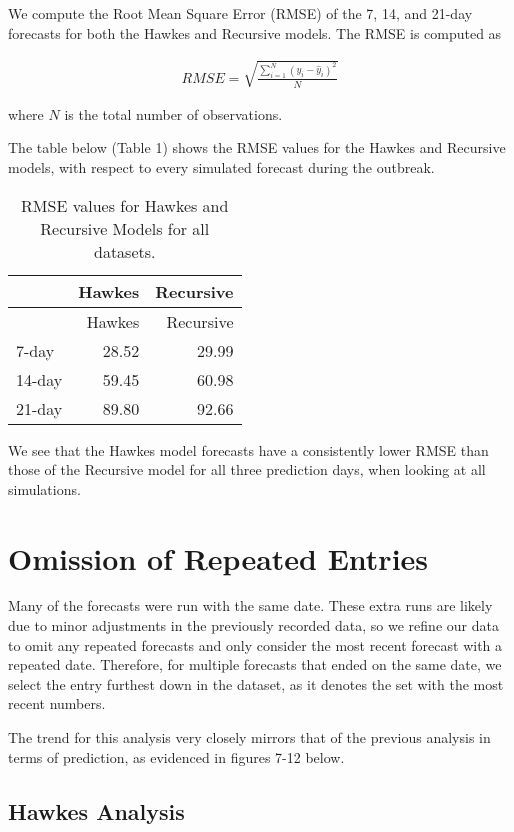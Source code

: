 \documentclass[
]{article}
\begin{document}
We compute the Root Mean Square Error (RMSE) of the 7, 14, and 21-day
forecasts for both the Hawkes and Recursive models. The RMSE is computed
as

\[
\begin{aligned}
RMSE = \sqrt{\frac{\sum_{i=1}^{N}(y_i - \hat{y}_i)^2}{N}}
\end{aligned}
\]

where \(N\) is the total number of observations.

The table below (Table 1) shows the RMSE values for the Hawkes and
Recursive models, with respect to every simulated forecast during the
outbreak.

\begin{longtable}[]{@{}lrr@{}}
\caption{RMSE values for Hawkes and Recursive Models for all
datasets.}\tabularnewline
\toprule
& Hawkes & Recursive\tabularnewline
\midrule
\endfirsthead
\toprule
& Hawkes & Recursive\tabularnewline
\midrule
\endhead
7-day & 28.52 & 29.99\tabularnewline
14-day & 59.45 & 60.98\tabularnewline
21-day & 89.80 & 92.66\tabularnewline
\bottomrule
\end{longtable}

We see that the Hawkes model forecasts have a consistently lower RMSE
than those of the Recursive model for all three prediction days, when
looking at all simulations.

\pagebreak

\hypertarget{omission-of-repeated-entries}{%
\section{Omission of Repeated
Entries}\label{omission-of-repeated-entries}}

Many of the forecasts were run with the same date. These extra runs are
likely due to minor adjustments in the previously recorded data, so we
refine our data to omit any repeated forecasts and only consider the
most recent forecast with a repeated date. Therefore, for multiple
forecasts that ended on the same date, we select the entry furthest down
in the dataset, as it denotes the set with the most recent numbers.

The trend for this analysis very closely mirrors that of the previous
analysis in terms of prediction, as evidenced in figures 7-12 below.

\hypertarget{hawkes-analysis}{%
\subsection{Hawkes Analysis}\label{hawkes-analysis}}
\end{document}

